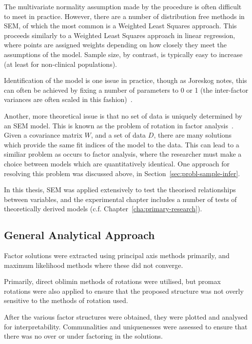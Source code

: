 The multivariate normality assumption made by the procedure is often difficult to meet in practice. However, there are a number of distribution free methods in SEM, of which the most common is a Weighted Least Squares approach. This proceeds similarly to a Weighted Least Squares approach in linear regression, where points are assigned weights depending on how closely they meet the assumptions of the model. Sample size, by contrast, is typically easy to increase (at least for non-clinical populations).

Identification of the model is one issue in practice, though as Joreskog notes, this can often be achieved by fixing a number of parameters to 0 or 1 (the inter-factor variances are often scaled in this fashion)~\cite{joreskog1978structural}.

Another, more theoretical issue is that no set of data is uniquely determined by an SEM model. This is known as the problem of rotation in factor analysis~\cite{maccallum2000applications}. Given a covariance matrix $W$, and a set of data $D$, there are many solutions which provide the same fit indices of the model to the data. This can lead to a similiar problem as occurs to factor analysis, where the researcher must make a choice between models which are quantitatively identical. One approach for resolving this problem was discussed above, in Section~\ref{sec:probl-sample-infer}.

In this thesis, SEM was applied extensively to test the theorised relationships between variables, and the experimental chapter includes a number of tests of theoretically derived models (c.f. Chapter~\ref{cha:primary-research}).

\subsection{General Analytical Approach}
\label{sec:gener-analyt-appr}




Factor solutions were extracted using principal axis methods primarily, and maximum likelihood methods where these did not converge.

Primarily, direct oblimin methods of rotations were utilised, but promax rotations were also applied to ensure that the proposed structure was not overly sensitive to the methods of rotation used.

After the various factor structures were obtained, they were plotted and analysed for interpretability. Communalities and uniquenesses were assessed to ensure that there was no over or under factoring in the solutions. %

